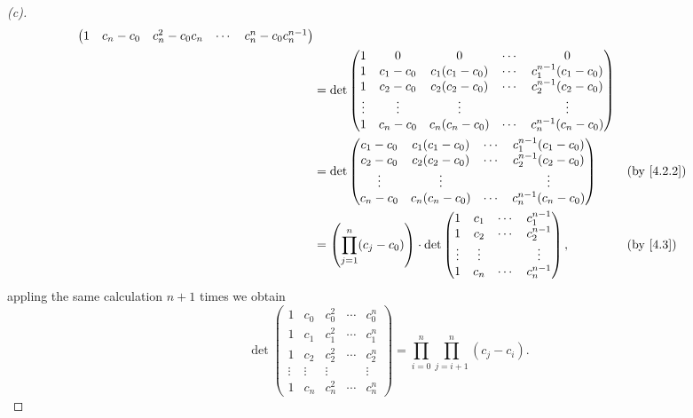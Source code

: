 \begin{proof}[(c)]
\begin{align*}
\begin{pmatrix}
			       1      & c_n - c_0 & c_n^2 - c_0 c_n & \cdots & c_n^n - c_0 c_n^{n - 1}
		       \end{pmatrix}             \\
		 & = \det\begin{pmatrix}
			         1      & 0         & 0               & \cdots & 0                       \\
			         1      & c_1 - c_0 & c_1 (c_1 - c_0) & \cdots & c_1^{n - 1} (c_1 - c_0) \\
			         1      & c_2 - c_0 & c_2 (c_2 - c_0) & \cdots & c_2^{n - 1} (c_2 - c_0) \\
			         \vdots & \vdots    & \vdots          &        & \vdots                  \\
			         1      & c_n - c_0 & c_n (c_n - c_0) & \cdots & c_n^{n - 1} (c_n - c_0)
		         \end{pmatrix}           \\
		 & = \det\begin{pmatrix}
			         c_1 - c_0 & c_1 (c_1 - c_0) & \cdots & c_1^{n - 1} (c_1 - c_0) \\
			         c_2 - c_0 & c_2 (c_2 - c_0) & \cdots & c_2^{n - 1} (c_2 - c_0) \\
			         \vdots    & \vdots          &        & \vdots                  \\
			         c_n - c_0 & c_n (c_n - c_0) & \cdots & c_n^{n - 1} (c_n - c_0)
		         \end{pmatrix}          &  & \by{4.2.2}                    \\
		 & = \pa{\prod_{j = 1}^n (c_j - c_0)} \cdot \det\begin{pmatrix}
			                                                1      & c_1    & \cdots & c_1^{n - 1} \\
			                                                1      & c_2    & \cdots & c_2^{n - 1} \\
			                                                \vdots & \vdots &        & \vdots      \\
			                                                1      & c_n    & \cdots & c_n^{n - 1}
		                                                \end{pmatrix},               &  & \by{4.3}
	\end{align*}
	appling the same calculation \(n + 1\) times we obtain
	\[
		\det\begin{pmatrix}
			1      & c_0    & c_0^2  & \cdots & c_0^n  \\
			1      & c_1    & c_1^2  & \cdots & c_1^n  \\
			1      & c_2    & c_2^2  & \cdots & c_2^n  \\
			\vdots & \vdots & \vdots &        & \vdots \\
			1      & c_n    & c_n^2  & \cdots & c_n^n
		\end{pmatrix} = \prod_{i = 0}^n \prod_{j = i + 1}^n (c_j - c_i).
	\]
\end{proof}

